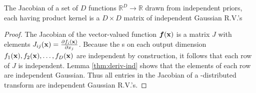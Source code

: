 \begin{lemma}
\label{thm:matrix}
The Jacobian of a set of $D$ functions $\mathbb{R}^D \rightarrow \mathbb{R}$ drawn from independent \gp{} priors, each having product kernel is a $D \times D$ matrix of independent Gaussian R.V.'s
\end{lemma}
%
\begin{proof}
The Jacobian of the vector-valued function $\boldsymbol{f}({\bf{x}})$ is a matrix $J$ with elements ${J_{ij}({\bf{x}}) = \frac{ \partial f_i ({\bf{x}}) }{\partial x_j}}$.
%
%
%
Because the \gp{}s on each output dimension $f_1({\bf{x}}), f_2({\bf{x}}), \dots, f_D({\bf{x}})$ are independent by construction, it follows that each row of $J$ is independent.
Lemma \ref{thm:deriv-ind} shows that the elements of each row are independent Gaussian.
Thus all entries in the Jacobian of a \gp{}-distributed transform are independent Gaussian R.V.'s.
\end{proof}



